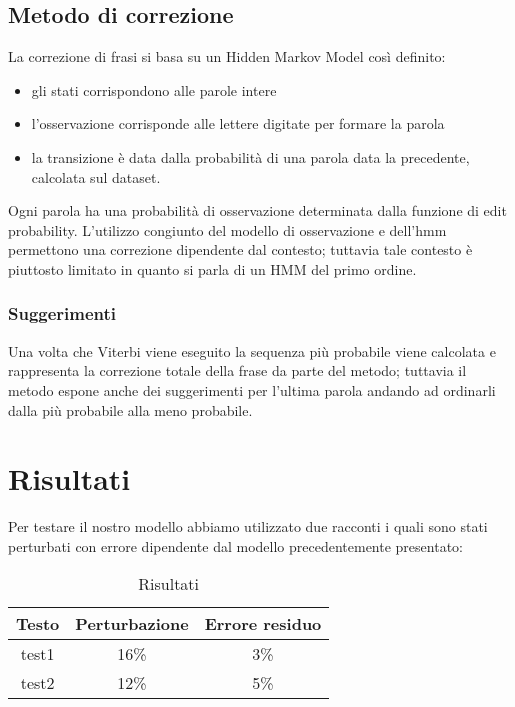 \documentclass[a4paper,11pt]{article}
\begin{document}
	\subsection{Metodo di correzione}
    	La correzione di frasi si basa su un Hidden Markov Model così definito:
         \begin{itemize}
  			\item gli stati corrispondono alle parole intere
  			\item l'osservazione corrisponde alle lettere digitate per formare la parola
  			\item la transizione è data dalla probabilità di una parola data la precedente, calcolata sul dataset.
 		\end{itemize}
        Ogni parola ha una probabilità di osservazione determinata dalla funzione di edit probability. L'utilizzo congiunto del modello di osservazione
        e dell'hmm permettono una correzione dipendente dal contesto; tuttavia tale contesto è piuttosto limitato in quanto si parla di un HMM del primo ordine.
        \subsubsection{Suggerimenti}
          Una volta che Viterbi viene eseguito la sequenza più probabile viene calcolata e rappresenta la correzione totale della frase da parte del metodo; 
          tuttavia il metodo espone anche dei suggerimenti per l'ultima parola andando ad ordinarli dalla più probabile alla meno probabile.
 	\newpage
\section{Risultati}
	Per testare il nostro modello abbiamo utilizzato due racconti i quali sono stati perturbati con errore dipendente dal modello precedentemente presentato:\\
     \begin{table}[h]
     \centering
     \begin{tabular}{|c|c|c|}
     \hline
      \textbf{Testo} & \textbf{Perturbazione} & \textbf{Errore residuo}\\
     \hline
        test1 & 16\% &  3\% \\
     \hline 
        test2 & 12\% & 5\%\\
     \hline
     \end{tabular}
     	\caption{Risultati}
     \end{table}
\end{document}
